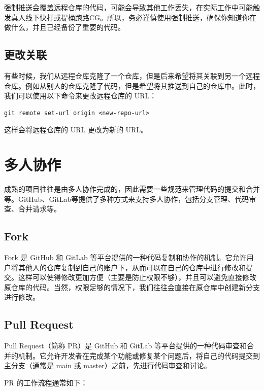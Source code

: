 \begin{warning}
  强制推送会覆盖远程仓库的代码，可能会导致其他工作丢失，在实际工作中可能触发真人线下快打或提桶跑路CG。所以，务必谨慎使用强制推送，确保你知道你在做什么，并且已经备份了重要的代码。
\end{warning}

\subsection{更改关联}

有些时候，我们从远程仓库克隆了一个仓库，但是后来希望将其关联到另一个远程仓库。例如从别人的仓库克隆了代码，但是希望将其推送到自己的仓库中。此时，我们可以使用以下命令来更改远程仓库的 URL：
\begin{verbatim}
git remote set-url origin <new-repo-url>
\end{verbatim}
这样会将远程仓库的 URL 更改为新的 URL。


\section{多人协作}

成熟的项目往往是由多人协作完成的，因此需要一些规范来管理代码的提交和合并等。GitHub、GitLab等提供了多种方式来支持多人协作，包括分支管理、代码审查、合并请求等。

\subsection{Fork}

Fork 是 GitHub 和 GitLab 等平台提供的一种代码复制和协作的机制。它允许用户将其他人的仓库复制到自己的账户下，从而可以在自己的仓库中进行修改和提交。这样可以使得修改更加方便（主要是防止权限不够），并且可以避免直接修改原仓库的代码。当然，权限足够的情况下，我们往往会直接在原仓库中创建新分支进行修改。

\subsection{Pull Request}\label{sec:pull-request}
Pull Request（简称 PR）是 GitHub 和 GitLab 等平台提供的一种代码审查和合并的机制。它允许开发者在完成某个功能或修复某个问题后，将自己的代码提交到主分支（通常是 main 或 master）之前，先进行代码审查和讨论。

PR 的工作流程通常如下：

